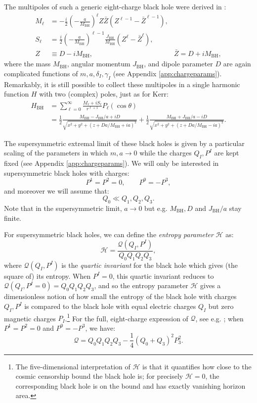 \documentclass[12pt,a4paper]{article}
\newcommand{\be}{\begin{equation}}
\newcommand{\ee}{\end{equation}}
\begin{document}
The multipoles of such a generic eight-charge black hole were derived in \cite{Bena:2020see,Bena:2020uup}:
\begin{align}
\nonumber  M_\ell &= -\frac{i}{2} \left( -\frac{a}{M_\text{BH}}\right)^\ell Z \bar{Z} (Z^{\ell-1}-\bar{Z}^{\ell-1}),\\
\label{eq:MSgenBH} S_\ell &= \frac{i}{2} \left( -\frac{a}{M_\text{BH}}\right)^{\ell-1} \frac{J_\text{BH}}{M_\text{BH}} (Z^\ell-\bar{Z}^\ell),\\
 \nonumber Z & \equiv D - iM_\text{BH}, & \bar{Z} = D + i M_\text{BH},
 \end{align}
 where the mass $M_\text{BH}$, angular momentum $J_\text{BH}$, and dipole parameter $D$ are again complicated functions of $m,a,\delta_I,\gamma_I$ (see Appendix \ref{app:chargeparams}). Remarkably, it is still possible to collect these multipoles in a single harmonic function $H$ with two (complex) poles, just as for Kerr:
 \begin{align} H_{\text{BH}} &= \sum_{\ell=0}^\infty \frac{M_\ell + i S_\ell}{r^{\ell+1}}P_{\ell}(\cos\theta) \\
 &= \frac12 \frac{M_\text{BH}- J_\text{BH}/a  + i D}{\sqrt{x^2+y^2+(z+Da/M_\text{BH} + i a)^2}} +\frac12 \frac{M_\text{BH}+ J_\text{BH}/a  - i D}{\sqrt{x^2+y^2+(z+Da/M_\text{BH} - i a)^2}}.
 \label{eq:HBH}
 \end{align}


The supersymmetric extremal limit of these black holes is given by a particular scaling of the parameters in which $m,a\rightarrow 0$ while the charges $Q_I,P^I$ are kept fixed (see Appendix \ref{app:chargeparams}). We will only be interested in supersymmetric black holes with charges:
\be P^1=P^2 = 0, \qquad P^0 = -P^3,\ee
and moreover we will assume that:
\be Q_0\ll Q_1,Q_2,Q_3.\ee
Note that in the supersymmetric limit, $a\rightarrow 0$ but e.g. $M_\text{BH},D$ and $J_\text{BH}/a$ stay finite.

For supersymmetric black holes, we can define the \emph{entropy parameter} $\mathcal{H}$ as:
\be \label{eq:Hdef} \mathcal{H} = \frac{\mathcal{Q}(Q_I,P^I)}{Q_0Q_1Q_2Q_3},\ee
where $\mathcal{Q}(Q_I,P^I)$ is the \emph{quartic invariant} for the black hole which gives (the square of) its entropy. When $P^I=0$, this quartic invariant reduces to $\mathcal{Q}(Q_I,P^I=0)=Q_0Q_1Q_2Q_3$, and so the entropy parameter $\mathcal{H}$ gives a dimensionless notion of how small the entropy of the black hole with charges $Q_I,P^I$ is compared to the black hole with equal electric charges $Q_I$ but zero magnetic charges $P_I$.\footnote{The five-dimensional interpretation of $\mathcal{H}$ is that it quantifies how close to the cosmic censorship bound the black hole is; for precisely $\mathcal{H}=0$, the corresponding black hole is on the bound and has exactly vanishing horizon area.} For the full, eight-charge expression of $\mathcal{Q}$, see e.g. \cite{Bena:2020uup}; when $P^1=P^2=0$ and $P^0=-P^3$, we have:
\be \mathcal{Q} = Q_0 Q_1Q_2Q_3 -\frac14 (Q_0+Q_3)^2 P_3^2.\ee
\end{document}
